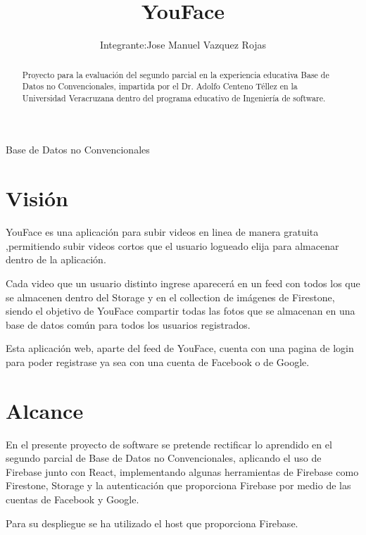 \documentclass{article}
\title{YouFace}
\author{Integrante:Jose Manuel Vazquez Rojas}
\begin{document}
\maketitle
\begin{center}
{\Huge Base de Datos no Convencionales} 
\end{center}
\begin{abstract}
Proyecto para la evaluación del segundo parcial en la experiencia educativa Base de Datos no Convencionales, impartida por el Dr. Adolfo Centeno Téllez en la Universidad Veracruzana dentro del programa educativo de Ingeniería de software.
\end{abstract}
\section{Visión}
YouFace es una aplicación para subir videos en linea de manera gratuita ,permitiendo subir videos cortos que el usuario logueado elija para almacenar dentro de la aplicación.

Cada video que un usuario distinto ingrese aparecerá en un feed con todos los que se almacenen dentro del Storage y en el collection de imágenes de Firestone, siendo el objetivo de YouFace compartir todas las fotos que se almacenan en una base de datos común para todos los usuarios registrados. 

Esta aplicación web, aparte del feed de YouFace, cuenta con una pagina de login para poder registrase ya sea con una cuenta de Facebook o de Google.

\section{Alcance}
En el presente proyecto de software se pretende rectificar lo aprendido en el segundo parcial de Base de Datos no Convencionales, aplicando el uso de Firebase junto con React, implementando algunas herramientas de Firebase como Firestone, Storage y la autenticación que proporciona Firebase por medio de las cuentas de Facebook y Google.

Para su despliegue se ha utilizado el host que proporciona Firebase.
\end{document}
